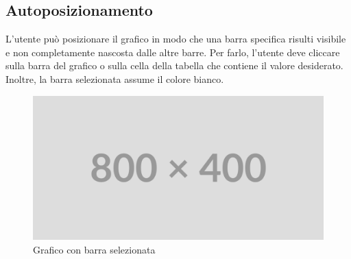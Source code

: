 \subsection{Autoposizionamento}
L'utente può posizionare il grafico in modo che una barra specifica risulti
visibile e non completamente nascosta dalle altre barre. 
Per farlo, l'utente deve cliccare sulla barra del grafico o sulla
cella della tabella che contiene il valore desiderato. Inoltre, la barra
selezionata assume il colore bianco.
\begin{figure}[h!]
    \centering
    \includegraphics[scale=0.6]{template/images/placeholder.png}
    \caption{Grafico con barra selezionata}
\end{figure}